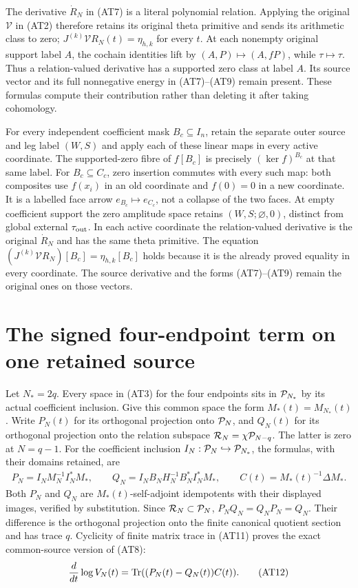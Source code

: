 The derivative $\dot R_N$ in (AT7) is a literal polynomial relation.
Applying the original $\mathcal V$ in (AT2) therefore retains its
original theta primitive and sends its arithmetic class to zero;
$J^{(k)}\mathcal V R_N(t)=\eta_{h,k}$ for every $t$.
At each nonempty original support label $A$, the cochain identities
lift by $(A,P)\mapsto(A,fP)$, while $\tau\mapsto\tau$.
Thus a relation-valued derivative has a supported zero class at
label $A$. Its source vector and its full nonnegative energy in
(AT7)--(AT9) remain present. These formulas compute their
contribution rather than deleting it after taking cohomology.

For every independent coefficient mask $B_c\subseteq I_n$, retain
the separate outer source and leg label $(W,S)$ and apply each of
these linear maps in every active coordinate. The supported-zero
fibre of $f[B_c]$ is precisely $(\ker f)^{B_c}$ at that same label.
For $B_c\subseteq C_c$, zero insertion commutes with every such
map: both composites use $f(x_i)$ in an old coordinate and $f(0)=0$
in a new coordinate. It is a labelled face arrow $e_{B_c}\mapsto
e_{C_c}$, not a collapse of the two faces. At empty coefficient
support the zero amplitude space retains $(W,S;\varnothing,0)$,
distinct from global external $\tau_{\rm out}$.
In each active coordinate the relation-valued derivative
is the original $\dot R_N$ and has the same theta primitive.
The equation $(J^{(k)}\mathcal V R_N)[B_c]=\eta_{h,k}[B_c]$
holds because it is the already proved equality in every coordinate.
The source derivative and the forms (AT7)--(AT9) remain the original
ones on those vectors.

\section{The signed four-endpoint term on one retained source}

Let $N_*=2q$. Every space in (AT3) for the four endpoints sits in
$\mathcal P_{N_*}$ by its actual coefficient inclusion. Give this common
space the form $M_*(t)=M_{N_*}(t)$. Write $P_N(t)$ for its
orthogonal projection onto $\mathcal P_N$, and $Q_N(t)$ for its
orthogonal projection onto the relation subspace
$\mathcal R_N=\chi\mathcal P_{N-q}$. The latter is zero at $N=q-1$.
For the coefficient inclusion $I_N:\mathcal P_N\hookrightarrow\mathcal P_{N_*}$,
the formulas, with their domains retained, are
\[
 \begin{gathered}
 P_N=I_NM_N^{-1}I_N^*M_*,\qquad
 Q_N=I_NB_NH_N^{-1}B_N^*I_N^*M_*,\qquad
 C(t)=M_*(t)^{-1}\Delta M_*.                   \end{gathered}
 \tag{AT11}
\]
Both $P_N$ and $Q_N$ are $M_*(t)$-self-adjoint idempotents with
their displayed images, verified by substitution. Since
$\mathcal R_N\subset\mathcal P_N$, $P_NQ_N=Q_NP_N=Q_N$. Their difference is
the orthogonal projection onto the finite canonical quotient
section and has trace $q$. Cyclicity of finite matrix trace in
(AT11) proves the exact common-source version of (AT8):
\[
 \frac{d}{dt}\log V_N(t)=\operatorname{Tr}((P_N(t)-Q_N(t))C(t)).
                                                        \tag{AT12}
\]

